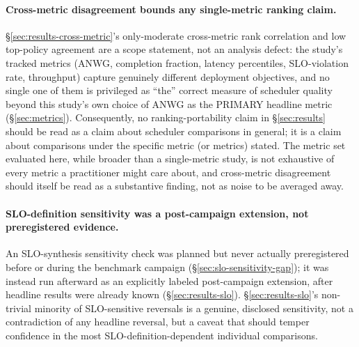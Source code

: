 \paragraph{Cross-metric disagreement bounds any single-metric ranking
claim.} \S\ref{sec:results-cross-metric}'s only-moderate cross-metric rank
correlation and low top-policy agreement are a scope statement, not an
analysis defect: the study's tracked metrics (ANWG, completion fraction,
latency percentiles, SLO-violation rate, throughput) capture genuinely
different deployment objectives, and no single one of them is privileged
as ``the'' correct measure of scheduler quality beyond this study's own
choice of ANWG as the PRIMARY headline metric (\S\ref{sec:metrics}).
Consequently, no ranking-portability claim in \S\ref{sec:results} should
be read as a claim about scheduler comparisons in general; it is a claim
about comparisons under the specific metric (or metrics) stated. The
metric set evaluated here, while broader than a single-metric study, is
not exhaustive of every metric a practitioner might care about, and
cross-metric disagreement should itself be read as a substantive finding,
not as noise to be averaged away.

\paragraph{SLO-definition sensitivity was a post-campaign extension, not
preregistered evidence.} An SLO-synthesis sensitivity check was planned but
never actually preregistered before or during the benchmark campaign
(\S\ref{sec:slo-sensitivity-gap}); it was instead run afterward as an
explicitly labeled post-campaign extension, after headline results were
already known (\S\ref{sec:results-slo}). \S\ref{sec:results-slo}'s
non-trivial minority of SLO-sensitive reversals is a genuine, disclosed
sensitivity, not a contradiction of any headline reversal, but a caveat
that should temper confidence in the most SLO-definition-dependent
individual comparisons.

